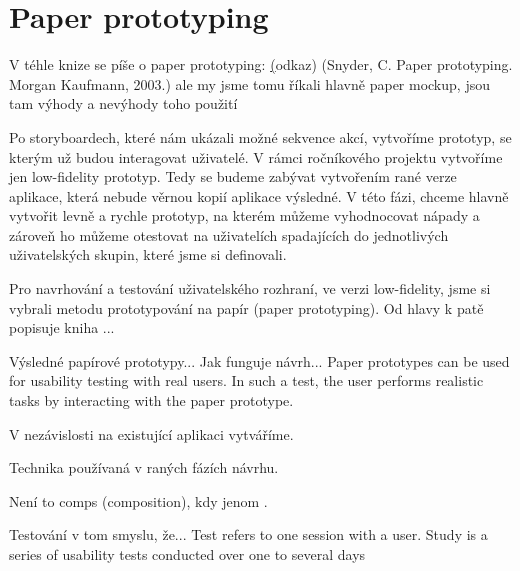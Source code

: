\chapter{Paper prototyping}



V téhle knize se píše o paper prototyping: \href{https://books.google.cz/books?id=YgBojJsVLGMC&lpg=PP1&ots=1pVOrY-_2I&dq=Snyder%2C%20C.%20Paper%20prototyping.%20Morgan%20Kaufmann%2C%202003.&lr&hl=cs&pg=PA5#v=onepage&q=Snyder,%20C.%20Paper%20prototyping.%20Morgan%20Kaufmann,%202003.&f=false}(odkaz) (Snyder, C. Paper prototyping. Morgan Kaufmann, 2003.) ale my jsme tomu říkali hlavně paper mockup, jsou tam výhody a nevýhody toho použití

Po storyboardech, které nám ukázali možné sekvence akcí, vytvoříme prototyp, se kterým už budou interagovat uživatelé. V rámci ročníkového projektu vytvoříme jen low-fidelity prototyp. Tedy se budeme zabývat vytvořením rané verze aplikace, která nebude věrnou kopií aplikace výsledné. V této fázi, chceme hlavně vytvořit levně a rychle prototyp, na kterém můžeme vyhodnocovat nápady a zároveň ho můžeme otestovat na uživatelích spadajících do jednotlivých uživatelských skupin, které jsme si definovali.

Pro navrhování a testování uživatelského rozhraní, ve verzi low-fidelity, jsme si vybrali metodu prototypování na papír (paper prototyping). Od hlavy k patě popisuje kniha ...

Výsledné papírové prototypy... Jak funguje návrh...
Paper prototypes can be used for usability testing with real users. In such a test, the user performs realistic tasks by interacting with the paper prototype.

V nezávislosti na existující aplikaci vytváříme.

Technika používaná v raných fázích návrhu.

Není to comps (composition), kdy jenom . 

Testování v tom smyslu, že... Test refers to one session with a user. Study is a series of usability tests conducted over one to several days
